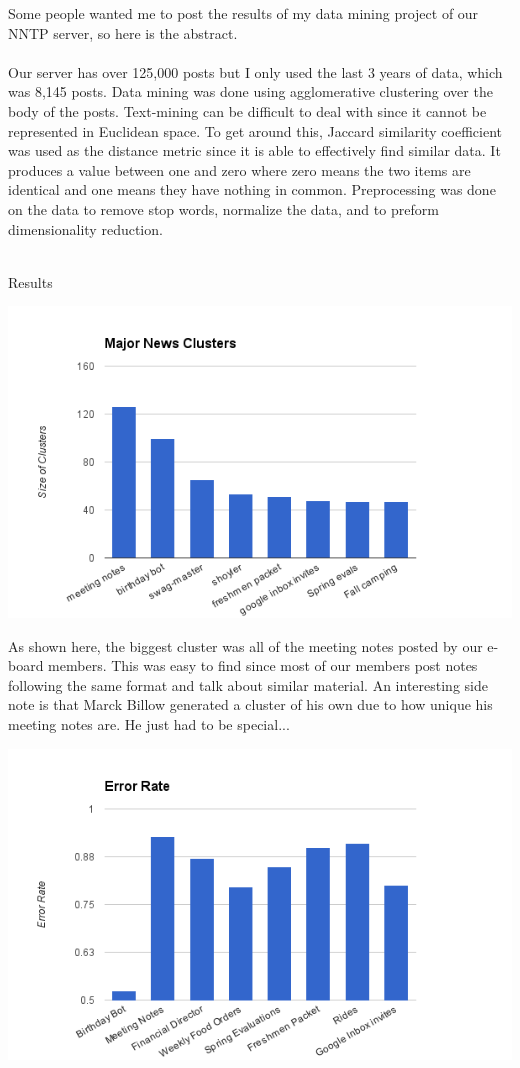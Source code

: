 \documentclass[9pt]{extarticle} %
\begin{document}
\pagebreak

\hypertarget{secondnews}{} 

Some people wanted me to post the results of my data mining project of our NNTP server, so here is the abstract.  \\
\\
Our server has over 125,000 posts but I only used the last 3 years of data, which was 8,145 posts. Data mining was done using agglomerative clustering over the body of the posts. Text-mining can be difficult to deal with since it cannot be represented in Euclidean space. To get around this, Jaccard similarity coefficient was used as the distance metric since it is able to effectively find similar data. It produces a   value between one and zero where zero means the two items are identical and one means they have nothing in common. Preprocessing was done on the data to remove stop words, normalize the data, and to preform dimensionality reduction. \\
\\
\centerline{Results}

\centerline{\includegraphics[width=0.8\linewidth]{imgs/2016-02-15-clusters.png}}

As shown here, the biggest cluster was all of the meeting notes posted by our e-board members. This was easy to find since most of our members post notes following the same format and talk about similar material. An interesting side note is that Marck Billow generated a cluster of his own due to how unique his meeting notes are. He just had to be special...

\centerline{\includegraphics[width=0.8\linewidth]{imgs/2016-02-15-error.png}}
\end{document}
